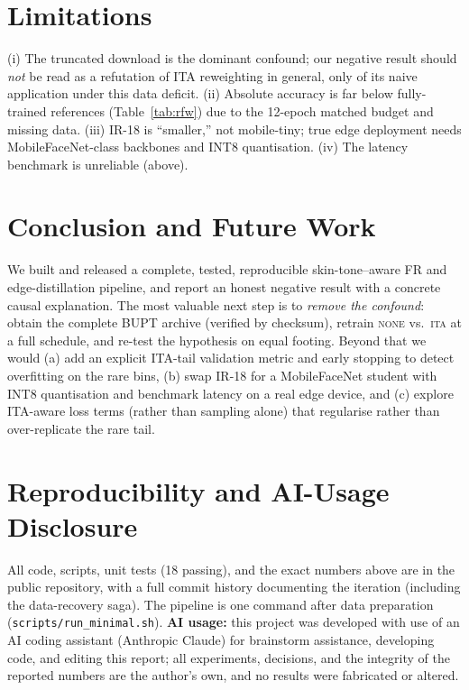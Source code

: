 \documentclass[10pt,twocolumn]{article}
\begin{document}
\section{Limitations}
(i) The truncated download is the dominant confound; our negative result should
\emph{not} be read as a refutation of ITA reweighting in general, only of its
naive application under this data deficit. (ii) Absolute accuracy is far below
fully-trained references (Table~\ref{tab:rfw}) due to the 12-epoch matched
budget and missing data. (iii) IR-18 is ``smaller,'' not mobile-tiny; true edge
deployment needs MobileFaceNet-class backbones and INT8 quantisation. (iv) The
latency benchmark is unreliable (above).

\section{Conclusion and Future Work}
We built and released a complete, tested, reproducible skin-tone--aware FR and
edge-distillation pipeline, and report an honest negative result with a concrete
causal explanation. The most valuable next step is to \emph{remove the
confound}: obtain the complete BUPT archive (verified by checksum), retrain
\textsc{none} vs.\ \textsc{ita} at a full schedule, and re-test the hypothesis on
equal footing. Beyond that we would (a) add an explicit ITA-tail validation
metric and early stopping to detect overfitting on the rare bins, (b) swap IR-18
for a MobileFaceNet student with INT8 quantisation and benchmark latency on a
real edge device, and (c) explore ITA-aware loss terms (rather than sampling
alone) that regularise rather than over-replicate the rare tail.

\section*{Reproducibility and AI-Usage Disclosure}
All code, scripts, unit tests (18 passing), and the exact numbers above are in
the public repository, with a full commit history documenting the iteration
(including the data-recovery saga). The pipeline is one command after data
preparation (\texttt{scripts/run\_minimal.sh}). \textbf{AI usage:} this project
was developed with use of an AI coding assistant (Anthropic Claude) for brainstorm assistance,
developing code, and editing this
report; all experiments, decisions, and the integrity of the reported numbers
are the author's own, and no results were fabricated or altered.
\end{document}
